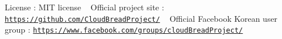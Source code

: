 License \+: M\+IT license ~\newline
Official project site \+: \href{https://github.com/CloudBreadProject/}{\tt https\+://github.\+com/\+Cloud\+Bread\+Project/} ~\newline
Official Facebook Korean user group \+: \href{https://www.facebook.com/groups/cloudBreadProject/}{\tt https\+://www.\+facebook.\+com/groups/cloud\+Bread\+Project/} ~\newline
